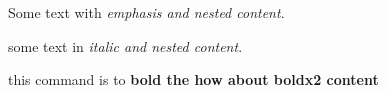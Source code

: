 \documentclass{article}
\begin{document}
Some text with \emph{emphasis and \emph{nested} content}.

some text in \textit{italic and \textit{nested} content}.

this command is to \textbf{bold the \textbf{how about boldx2} content}
\end{document}
